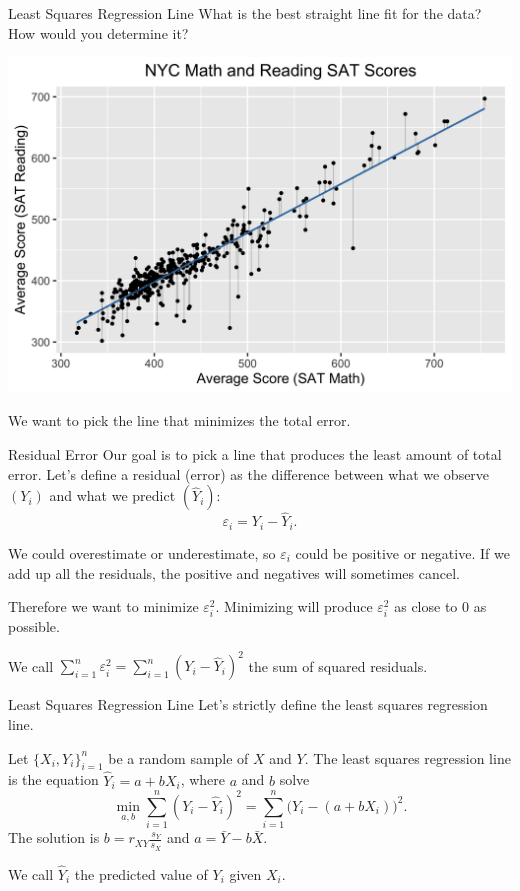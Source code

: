 \documentclass{beamer}
\begin{document}
\begin{frame}{Least Squares Regression Line}
	What is the best straight line fit for the data? How would you determine it?
	\begin{center}
		\includegraphics[width=.6\textwidth]{reg_line_resids.png}
	\end{center}
	We want to pick the line that minimizes the total error.
\end{frame}

\begin{frame}{Residual Error}
	Our goal is to pick a line that produces the least amount of total error. Let's define a \alert{residual} (error) as the difference between what we observe $(Y_i)$ and what we predict $(\hat{Y}_i)$:
	\[ \varepsilon_i = Y_i - \widehat{Y}_i. \]
	
	We could overestimate or underestimate, so $\varepsilon_i$ could be positive or negative. If we add up all the residuals, the positive and negatives will sometimes cancel.

	Therefore we want to minimize $\varepsilon_i^2$. Minimizing will produce $\varepsilon_i^2$ as close to 0 as possible.
	\vspace{.25in}
			
	We call $\displaystyle\sum_{i=1}^n \varepsilon_i^2 = \sum_{i=1}^n \left(Y_i - \widehat{Y}_i\right)^2$ the \alert{sum of squared residuals}.
\end{frame}

\begin{frame}{Least Squares Regression Line}
	Let's strictly define the least squares regression line.
	\begin{definition}
		Let $\{X_i,Y_i\}_{i=1}^n$ be a random sample of $X$ and $Y$. The \alert{least squares regression line} is the equation $\widehat{Y}_i = a + bX_i$, where $a$ and $b$ solve
		\[ \min_{a,b} \sum_{i=1}^{n}\left( Y_i - \widehat{Y}_i \right)^2 = \sum_{i=1}^{n}\Big ( Y_i - \left(a+bX_i\right) \Big )^2 . \]
		The solution is $b=r_{XY}\frac{s_Y}{s_X}$ and $a = \bar{Y} - b\bar{X}$.
	\end{definition}
	
	We call $\widehat{Y}_i$ the \alert{predicted value} of $Y_i$ given $X_i$.
\end{frame}
\end{document}
